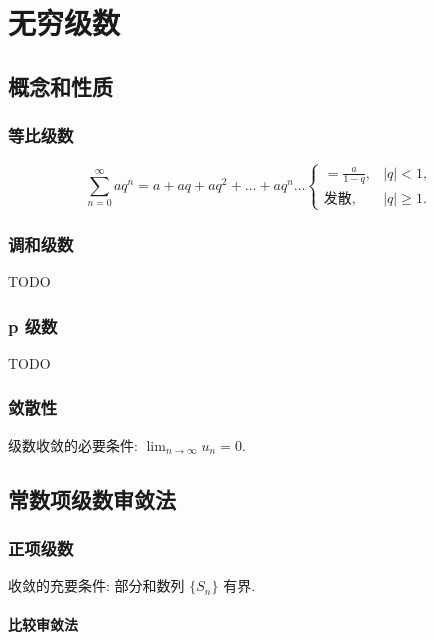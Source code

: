 \chapter{无穷级数}

\section{概念和性质}

\subsection{等比级数}

$$
    \sum_{n=0}^{\infty} aq^{n} = a + aq + aq^{2} + \dots + aq^{n} \dots
    \begin{cases}
        = \frac{a}{1-q}, & |q| < 1,    \\
        \mbox{发散},     & |q| \geq 1.
    \end{cases}
$$

\subsection{调和级数}

TODO

\subsection{p 级数}

TODO

\subsection{敛散性}

级数收敛的必要条件: $\lim_{n\to\infty} u_n = 0$.

\section{常数项级数审敛法}

\subsection{正项级数}

收敛的充要条件: 部分和数列 $\{S_n\}$ 有界.

\subsubsection{比较审敛法}

